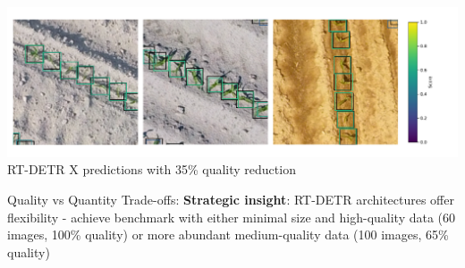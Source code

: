 \documentclass[aspectratio=43]{beamer}
\begin{document}
\begin{frame}
    \begin{center}
        \includegraphics[width=1\textwidth]{Imgs/many_shot_quality_annotations.pdf}
        \tiny RT-DETR X predictions with 35\% quality reduction
    \end{center}
    
    \begin{block}{Quality vs Quantity Trade-offs:}
        \scriptsize
        \textbf{Strategic insight}: RT-DETR architectures offer flexibility - achieve benchmark with either minimal size and high-quality data (60 images, 100\% quality) or more abundant medium-quality data (100 images, 65\% quality)
    \end{block}
\end{frame}
\end{document}
